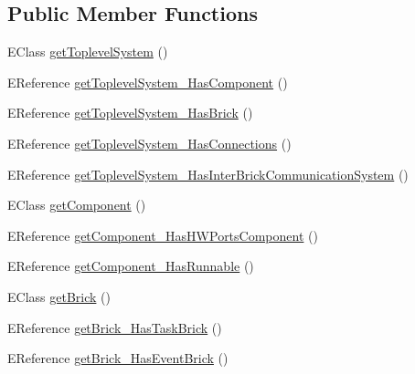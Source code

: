 \subsection*{Public Member Functions}
\begin{DoxyCompactItemize}
\item 
E\-Class \hyperlink{classshootingmachineemfmodel_1_1impl_1_1_shootingmachineemfmodel_package_impl_abc4b230ae491dbad8ba7ba99b4ad6a76}{get\-Toplevel\-System} ()
\item 
E\-Reference \hyperlink{classshootingmachineemfmodel_1_1impl_1_1_shootingmachineemfmodel_package_impl_a753d44a0a75ee264a13a210a1da72ef9}{get\-Toplevel\-System\-\_\-\-Has\-Component} ()
\item 
E\-Reference \hyperlink{classshootingmachineemfmodel_1_1impl_1_1_shootingmachineemfmodel_package_impl_a5e874c2ddcc6de9d8f36c590ebd7649e}{get\-Toplevel\-System\-\_\-\-Has\-Brick} ()
\item 
E\-Reference \hyperlink{classshootingmachineemfmodel_1_1impl_1_1_shootingmachineemfmodel_package_impl_a84dda694963625c1e76a6610c06e2868}{get\-Toplevel\-System\-\_\-\-Has\-Connections} ()
\item 
E\-Reference \hyperlink{classshootingmachineemfmodel_1_1impl_1_1_shootingmachineemfmodel_package_impl_a61cf3f17e8693a886224a06fe9c84e90}{get\-Toplevel\-System\-\_\-\-Has\-Inter\-Brick\-Communication\-System} ()
\item 
E\-Class \hyperlink{classshootingmachineemfmodel_1_1impl_1_1_shootingmachineemfmodel_package_impl_a375240560ab7b64152ec7b4e53a51ee3}{get\-Component} ()
\item 
E\-Reference \hyperlink{classshootingmachineemfmodel_1_1impl_1_1_shootingmachineemfmodel_package_impl_a9d3f7229195ba1c06938f5d64fd0cfcc}{get\-Component\-\_\-\-Has\-H\-W\-Ports\-Component} ()
\item 
E\-Reference \hyperlink{classshootingmachineemfmodel_1_1impl_1_1_shootingmachineemfmodel_package_impl_aa6c72c9b28cf2676c8526587b7285987}{get\-Component\-\_\-\-Has\-Runnable} ()
\item 
E\-Class \hyperlink{classshootingmachineemfmodel_1_1impl_1_1_shootingmachineemfmodel_package_impl_aaef94e2843dca6a355980df230d01339}{get\-Brick} ()
\item 
E\-Reference \hyperlink{classshootingmachineemfmodel_1_1impl_1_1_shootingmachineemfmodel_package_impl_a406625829d84cd66495e4857bfb21c8f}{get\-Brick\-\_\-\-Has\-Task\-Brick} ()
\item 
E\-Reference \hyperlink{classshootingmachineemfmodel_1_1impl_1_1_shootingmachineemfmodel_package_impl_a1f1752b30f3ab194d1a1848802a0e6cd}{get\-Brick\-\_\-\-Has\-Event\-Brick} ()

\end{DoxyCompactItemize}
